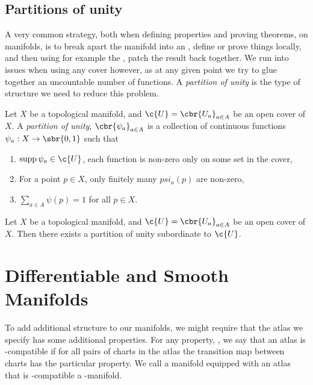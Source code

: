 \subsection{Partitions of unity}
A very common strategy, both when defining properties and proving theorems, on manifolds, is to break apart the manifold into an , define or prove things locally, and then using for example the , patch the result back together.
We run into issues when using any cover however, as at any given point we try to glue together an uncountable number of functions.
A \emph{partition of unity} is the type of structure we need to reduce this problem.
\begin{definition}
	\label{def:partition_of_unity}
	Let \(X\) be a topological manifold, and \(\c{U} = \cbr{U_a}_{a\in A}\) be an open cover of \(X\).
	A \emph{partition of unity}, \(\cbr{\psi_a}_{a\in A}\) is a collection of continuous functions \(\psi_a: X \to \sbr{0,1}\) such that 
	\begin{enumerate}
		\item \(\supp \psi_a \in \c{U}\), each function is non-zero only on some set in the cover,
		\item For a point \(p\in X\), only finitely many \(psi_a(p)\) are non-zero,
		\item \(\sum_{a\in A} \psi(p) = 1\) for all \(p\in X\).
	\end{enumerate}
\end{definition}
\begin{theorem}
	Let \(X\) be a topological manifold, and \(\c{U} = \cbr{U_a}_{a\in A}\) be an open cover of \(X\).
	Then there exists a partition of unity subordinate to \(\c{U}\).
\end{theorem}

\section{Differentiable and Smooth Manifolds}
\label{sec:smooth_manifolds}

To add additional structure to our manifolds, we might require that the atlas we specify has some additional properties.
For any property, , we say that an atlas is -compatible if for all pairs of charts in the atlas the transition map between charts has the particular property. We call a manifold equipped with an atlas that is -compatible a -manifold.

